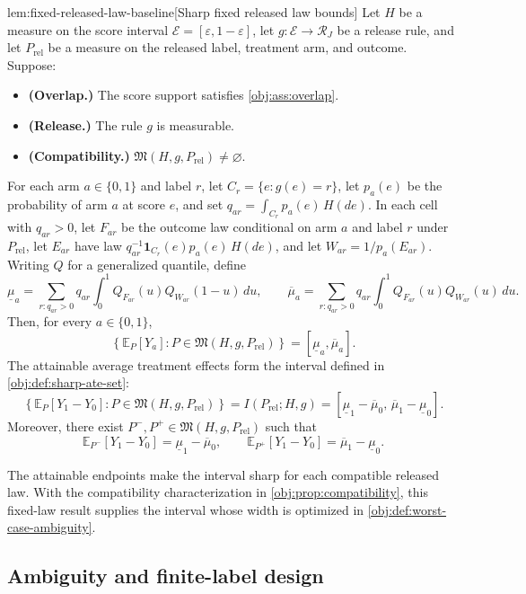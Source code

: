 \begin{lemmav}{lem:fixed-released-law-baseline}[Sharp fixed released law bounds]
Let \(H\) be a measure on the score interval \(\mathcal E=[\varepsilon,1-\varepsilon]\), let \(g:\mathcal E\to\mathcal R_J\) be a release rule, and let \(P_{\mathrm{rel}}\) be a measure on the released label, treatment arm, and outcome. Suppose:

\begin{itemize}
\item \textbf{(Overlap.)} The score support satisfies \cref{obj:ass:overlap}.
\item \textbf{(Release.)} The rule \(g\) is measurable.
\item \textbf{(Compatibility.)} \(\mathfrak M(H,g,P_{\mathrm{rel}})\ne\varnothing\).
\end{itemize}

For each arm \(a\in\{0,1\}\) and label \(r\), let \(C_r=\{e:g(e)=r\}\), let \(p_a(e)\) be the probability of arm \(a\) at score \(e\), and set \(q_{ar}=\int_{C_r}p_a(e)\,H(de)\). In each cell with \(q_{ar}>0\), let \(F_{ar}\) be the outcome law conditional on arm \(a\) and label \(r\) under \(P_{\mathrm{rel}}\), let \(E_{ar}\) have law \(q_{ar}^{-1}\mathbf 1_{C_r}(e)p_a(e)\,H(de)\), and let \(W_{ar}=1/p_a(E_{ar})\). Writing \(Q\) for a generalized quantile, define
\[
\underline\mu_a
=\sum_{r:q_{ar}>0}q_{ar}\int_0^1 Q_{F_{ar}}(u)Q_{W_{ar}}(1-u)\,du,
\qquad
\overline\mu_a
=\sum_{r:q_{ar}>0}q_{ar}\int_0^1 Q_{F_{ar}}(u)Q_{W_{ar}}(u)\,du.
\]
Then, for every \(a\in\{0,1\}\),
\[
\left\{\mathbb E_P[Y_a]:P\in\mathfrak M(H,g,P_{\mathrm{rel}})\right\}
=[\underline\mu_a,\overline\mu_a].
\]
The attainable average treatment effects form the interval defined in \cref{obj:def:sharp-ate-set}:
\[
\left\{\mathbb E_P[Y_1-Y_0]:P\in\mathfrak M(H,g,P_{\mathrm{rel}})\right\}
=I(P_{\mathrm{rel}};H,g)
=[\underline\mu_1-\overline\mu_0,\,
  \overline\mu_1-\underline\mu_0].
\]
Moreover, there exist \(P^-,P^+\in\mathfrak M(H,g,P_{\mathrm{rel}})\) such that
\[
\mathbb E_{P^-}[Y_1-Y_0]=\underline\mu_1-\overline\mu_0,
\qquad
\mathbb E_{P^+}[Y_1-Y_0]=\overline\mu_1-\underline\mu_0.
\]
\end{lemmav}

The attainable endpoints make the interval sharp for each compatible released law. With the compatibility characterization in \cref{obj:prop:compatibility}, this fixed-law result supplies the interval whose width is optimized in \cref{obj:def:worst-case-ambiguity}.

\subsection{Ambiguity and finite-label design}

